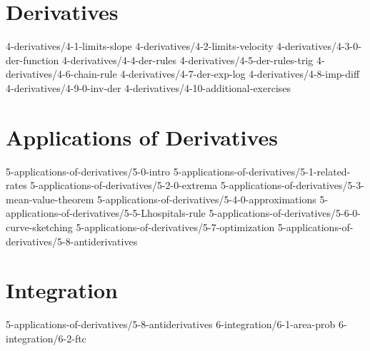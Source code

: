 \chapter{Derivatives}\label{chap:Derivatives}
	{4-derivatives/4-1-limits-slope}
	{4-derivatives/4-2-limits-velocity}
	{4-derivatives/4-3-0-der-function}
	{4-derivatives/4-4-der-rules}
	{4-derivatives/4-5-der-rules-trig}
	{4-derivatives/4-6-chain-rule}
	{4-derivatives/4-7-der-exp-log}
	{4-derivatives/4-8-imp-diff}
	{4-derivatives/4-9-0-inv-der}
	{4-derivatives/4-10-additional-exercises}
%
\chapter{Applications of Derivatives}\label{chap:ApplicationsOfDerivatives}
	{5-applications-of-derivatives/5-0-intro}
	{5-applications-of-derivatives/5-1-related-rates}
	{5-applications-of-derivatives/5-2-0-extrema}
	{5-applications-of-derivatives/5-3-mean-value-theorem}
	{5-applications-of-derivatives/5-4-0-approximations}
	{5-applications-of-derivatives/5-5-Lhospitals-rule}
	{5-applications-of-derivatives/5-6-0-curve-sketching}
	{5-applications-of-derivatives/5-7-optimization}
	{5-applications-of-derivatives/5-8-antiderivatives}
	
\chapter{Integration}\label{chap:Integration}
    {5-applications-of-derivatives/5-8-antiderivatives}
	{6-integration/6-1-area-prob}
	{6-integration/6-2-ftc}
	
